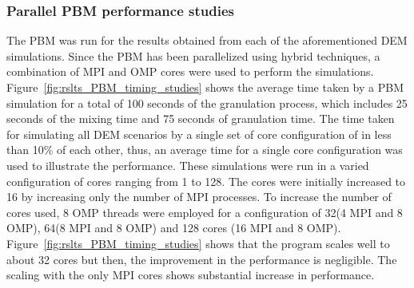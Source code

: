\documentclass[preprint,11pt,authoryear]{elsarticle}
\begin{document}
\subsubsection{Parallel PBM performance studies}
 The PBM was run for the results obtained from each of the aforementioned DEM simulations. 
Since the PBM has been parallelized using hybrid techniques, a combination of MPI and OMP cores 
were used to perform the simulations. Figure~\ref{fig:rslts_PBM_timing_studies} shows the average time 
taken by a PBM simulation for a total of 100 seconds of the granulation process, which includes 25 
seconds of the mixing time and 75 seconds of granulation time. The time taken for simulating all DEM 
scenarios by a single set of core configuration of in less than 10\% of each other, thus, an  average 
time for a single core configuration was used to illustrate the performance. 
These simulations were run in a varied configuration of cores ranging from 1 to 128. The cores were 
initially increased to 16 by increasing only the number of MPI processes. To increase the number of 
cores used, 8 OMP threads were employed for a configuration of 32(4 MPI  and 8 OMP), 64(8 MPI  and 8 OMP) 
and 128 cores (16 MPI  and 8 OMP). Figure~\ref{fig:rslts_PBM_timing_studies} shows that the program scales 
well to about 32 cores but then, the improvement in the performance is negligible. The scaling with the 
only MPI cores shows substantial increase in performance. \\
\end{document}
